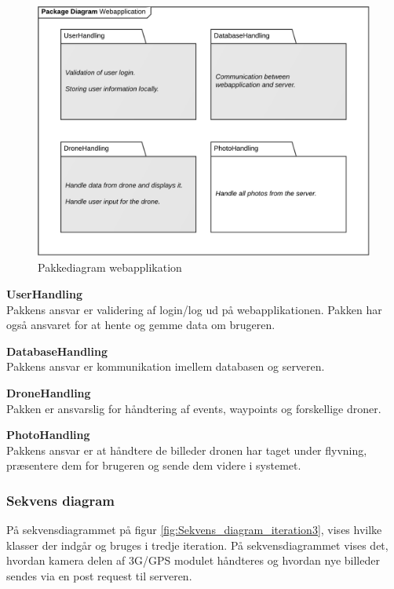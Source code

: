 \begin{figure}[H]
	\centering
	\includegraphics[width=1\textwidth]{Billeder/pakke_diagrammer/iteration3_server.png}
	\vspace{-0.5cm}
	\caption{Pakkediagram webapplikation}
	\label{fig:iteration3_pakke_diagram_webapplikation}
\end{figure}

\textbf{UserHandling}\\
Pakkens ansvar er validering af login/log ud på webapplikationen. Pakken har også ansvaret for at hente og gemme data om brugeren.

\textbf{DatabaseHandling}\\
Pakkens ansvar er kommunikation imellem databasen og serveren. 

\textbf{DroneHandling}\\
Pakken er ansvarslig for håndtering af events, waypoints og forskellige droner.

\textbf{PhotoHandling}\\
Pakkens ansvar er at håndtere de billeder dronen har taget under flyvning, præsentere dem for brugeren og sende dem videre i systemet.

\newpage

\subsubsection*{Sekvens diagram}
\vspace{-0.3cm}
På sekvensdiagrammet på figur \ref{fig:Sekvens_diagram_iteration3}, vises hvilke klasser der indgår og bruges i tredje iteration. På sekvensdiagrammet vises det, hvordan kamera delen af 3G/GPS modulet håndteres og hvordan nye billeder sendes via en post request til serveren. 

